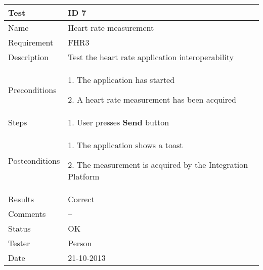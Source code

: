 \begin{table}
\begin{center}
\begin{tabular}{ | l | p{10cm} | }
	\hline
	\textbf{Test}	&	\textbf{ID 7} \\
	\hline\noalign{\smallskip}\noalign{\smallskip}\hline
	Name				& Heart rate measurement \\
	Requirement			& FHR3 \\
	Description			& Test the heart rate application interoperability \\
	Preconditions		&	\par 1. The application has started
							\par 2. A heart rate measurement has been acquired \\
	Steps 				&	\par 1. User presses \textbf{Send} button \\
	Postconditions		&	\par 1. The application shows a toast
							\par 2. The measurement is acquired by the Integration Platform\\
	Results				& Correct \\
	Comments			& --\\
	Status				& OK \\
	Tester				& Person \\
	Date				& 21-10-2013 \\
	\hline
\end{tabular}
\end{center}
\end{table}

